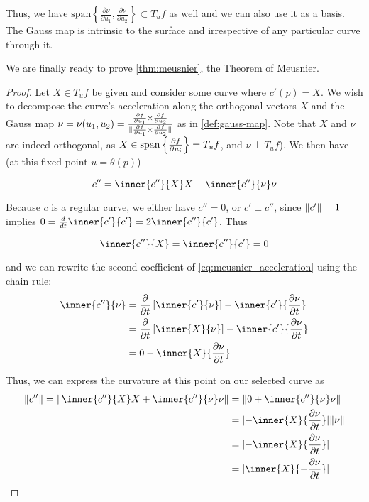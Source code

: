 	Thus, we have $\textrm{span}\left\{ \frac{\partial \nu}{\partial u_1}, \frac{\partial \nu}{\partial u_2}\right\} \subset T_u f$ as well and we can also use it as a basis.
  The Gauss map is intrinsic to the surface and irrespective of any particular curve through it.
	
	We are finally ready to prove \cref{thm:meusnier}, the Theorem of Meusnier.
	
	\begin{proof}
	Let $X\in T_u f$ be given and consider some curve where
  $c'(p) = X$.
  We wish to decompose the curve's acceleration along the  orthogonal vectors $X$ and
	the Gauss map $\nu = \nu(u_1, u_2) =
		\frac{\frac{\partial f}{\partial u_1} \times \frac{\partial f}{\partial u_2}}
		{\Vert\frac{\partial f}{\partial u_1} \times \frac{\partial f}{\partial u_2}\Vert}$ as in \cref{def:gauss-map}.
		Note that $X$ and $\nu$ are indeed orthogonal,
		as $ X \in \mathrm{span}\left\{\frac{\partial f}{\partial u_i}\right\} = T_u f$, and
		$\nu \perp T_u f$).
	 We then have (at this fixed point $u=\theta(p)$)
		
		\begin{equation} \label{eq:meusnier_acceleration}
			c'' = \inner{c''}{X} X + \inner{c''}{\nu}\nu
			\end{equation}
	
	Because $c$ is a regular curve, we either have $c''=0$,
	or $c' \perp c''$, since $\Vert c'\Vert = 1$ implies
	$0 = \frac{d}{dt} \inner{c'}{c'} = 2 \inner{c''}{c'} $. Thus
	
		\[ \inner{c''}{X} = \inner{c''}{c'} = 0 \]

	
	 and we can rewrite the second coefficient of \cref{eq:meusnier_acceleration} using the chain rule: %
	\begin{gather}
  \begin{aligned}
		\inner{c''}{\nu} &=
		\frac{\partial}{\partial t}\left[ \inner{c'}{\nu} \right]
			- \inner{c'}{\frac{\partial \nu}{\partial t}} \\
			&= \frac{\partial}{\partial t}\left[ \inner{X}{\nu} \right]
			- \inner{c'}{\frac{\partial \nu}{\partial t}} \\
			&= 0 - \inner{X}{\frac{\partial \nu}{\partial t}}
      \end{aligned}
			\end{gather}
	
	Thus, we can express the curvature at this point on our selected curve as
	\begin{align}
	\vnorm{c''} = \vnorm{\inner{c''}{X} X + \inner{c''}{\nu}\nu}
	&= \vnorm{0 + \inner{c''}{\nu}\nu}  \nonumber \\
	&= \abs{- \inner{X}{\frac{\partial \nu}{\partial t}}}\vnorm{\nu}  \nonumber \\
	&= \abs{- \inner{X}{\frac{\partial \nu}{\partial t}}}  \nonumber \\
	&=  \abs{\inner{X}{-\frac{\partial \nu}{\partial t}}} \label{eq:expand_accel_norm}
	\end{align}
	

\end{proof}
